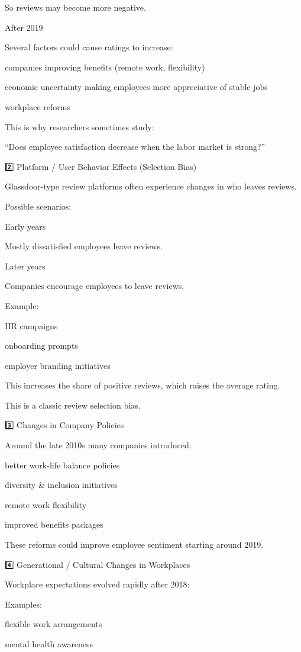 \documentclass[
]{article}
\begin{document}
So reviews may become more negative.

After 2019

Several factors could cause ratings to increase:

companies improving benefits (remote work, flexibility)

economic uncertainty making employees more appreciative of stable jobs

workplace reforms

This is why researchers sometimes study:

``Does employee satisfaction decrease when the labor market is strong?''

2️⃣ Platform / User Behavior Effects (Selection Bias)

Glassdoor-type review platforms often experience changes in who leaves
reviews.

Possible scenarios:

Early years

Mostly dissatisfied employees leave reviews.

Later years

Companies encourage employees to leave reviews.

Example:

HR campaigns

onboarding prompts

employer branding initiatives

This increases the share of positive reviews, which raises the average
rating.

This is a classic review selection bias.

3️⃣ Changes in Company Policies

Around the late 2010s many companies introduced:

better work-life balance policies

diversity \& inclusion initiatives

remote work flexibility

improved benefits packages

These reforms could improve employee sentiment starting around 2019.

4️⃣ Generational / Cultural Changes in Workplaces

Workplace expectations evolved rapidly after 2018:

Examples:

flexible work arrangements

mental health awareness
\end{document}
